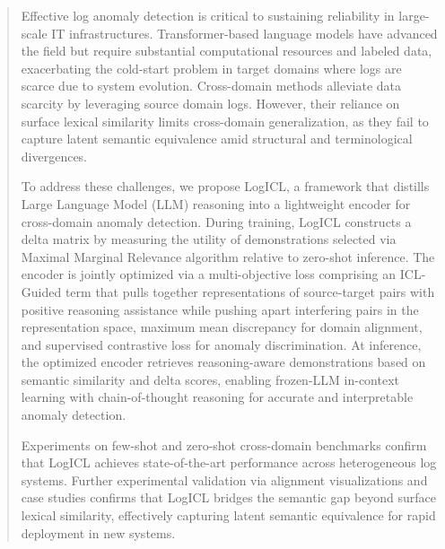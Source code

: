 \documentclass[lettersize,journal]{IEEEtran}
\begin{document}
\begin{abstract}
Effective log anomaly detection is critical to sustaining reliability in large-scale IT infrastructures. Transformer-based language models have advanced the field but require substantial computational resources and labeled data, exacerbating the cold-start problem in target domains where logs are scarce due to system evolution.
Cross-domain methods alleviate data scarcity by leveraging source domain logs. However, their reliance on surface lexical similarity limits cross-domain generalization, as they fail to capture latent semantic equivalence amid structural and terminological divergences.

To address these challenges, we propose LogICL, a framework that distills Large Language Model (LLM) reasoning into a lightweight encoder for cross-domain anomaly detection. 
During training, LogICL constructs a delta matrix by measuring the utility of demonstrations selected via Maximal Marginal Relevance algorithm relative to zero-shot inference.
The encoder is jointly optimized via a multi-objective loss comprising an ICL-Guided term that pulls together representations of source-target pairs with positive reasoning assistance while pushing apart interfering pairs in the representation space, maximum mean discrepancy for domain alignment, and supervised contrastive loss for anomaly discrimination. At inference, the optimized encoder retrieves reasoning-aware demonstrations based on semantic similarity and delta scores, enabling frozen-LLM in-context learning with chain-of-thought reasoning for accurate and interpretable anomaly detection.

Experiments on few-shot and zero-shot cross-domain benchmarks confirm that LogICL achieves state-of-the-art performance across heterogeneous log systems.
Further experimental validation via alignment visualizations and case studies confirms that LogICL bridges the semantic gap beyond surface lexical similarity, effectively capturing latent semantic equivalence for rapid deployment in new systems.

\end{abstract}
\end{document}
